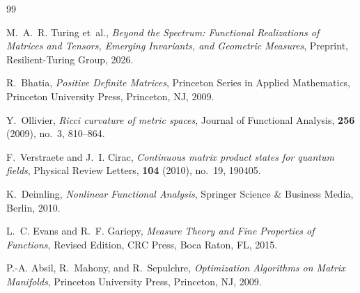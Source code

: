 \documentclass[11pt,a4paper,reqno]{amsart}
\theoremstyle{definition}
\numberwithin{equation}{section}
\begin{document}
\begin{thebibliography}{99}

M.~A.~R. Turing et~al.,
\emph{Beyond the Spectrum: Functional Realizations of Matrices and Tensors, Emerging Invariants, and Geometric Measures},
Preprint, Resilient-Turing Group, 2026.

R.~Bhatia,
\emph{Positive Definite Matrices},
Princeton Series in Applied Mathematics, Princeton University Press, Princeton, NJ, 2009.

Y.~Ollivier,
\emph{Ricci curvature of metric spaces},
Journal of Functional Analysis, \textbf{256} (2009), no.~3, 810--864.

F.~Verstraete and J.~I. Cirac,
\emph{Continuous matrix product states for quantum fields},
Physical Review Letters, \textbf{104} (2010), no.~19, 190405.

K.~Deimling,
\emph{Nonlinear Functional Analysis},
Springer Science \& Business Media, Berlin, 2010.

L.~C. Evans and R.~F. Gariepy,
\emph{Measure Theory and Fine Properties of Functions},
Revised Edition, CRC Press, Boca Raton, FL, 2015.

P.-A. Absil, R.~Mahony, and R.~Sepulchre,
\emph{Optimization Algorithms on Matrix Manifolds},
Princeton University Press, Princeton, NJ, 2009.

\end{thebibliography}
\end{document}
